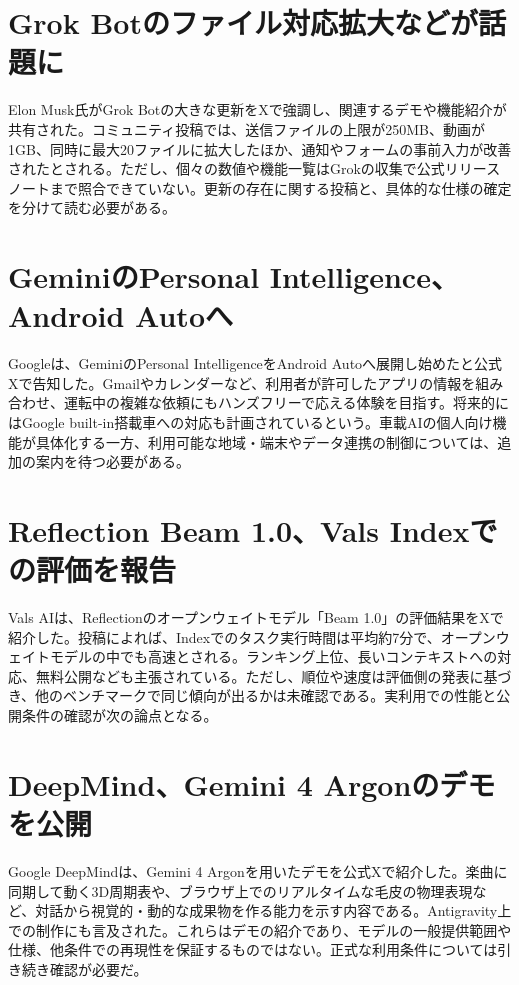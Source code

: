\section{Grok Botのファイル対応拡大などが話題に}
Elon Musk氏がGrok Botの大きな更新をXで強調し、関連するデモや機能紹介が共有された。コミュニティ投稿では、送信ファイルの上限が250MB、動画が1GB、同時に最大20ファイルに拡大したほか、通知やフォームの事前入力が改善されたとされる。ただし、個々の数値や機能一覧はGrokの収集で公式リリースノートまで照合できていない。更新の存在に関する投稿と、具体的な仕様の確定を分けて読む必要がある。

\section{GeminiのPersonal Intelligence、Android Autoへ}
Googleは、GeminiのPersonal IntelligenceをAndroid Autoへ展開し始めたと公式Xで告知した。Gmailやカレンダーなど、利用者が許可したアプリの情報を組み合わせ、運転中の複雑な依頼にもハンズフリーで応える体験を目指す。将来的にはGoogle built-in搭載車への対応も計画されているという。車載AIの個人向け機能が具体化する一方、利用可能な地域・端末やデータ連携の制御については、追加の案内を待つ必要がある。

\section{Reflection Beam 1.0、Vals Indexでの評価を報告}
Vals AIは、Reflectionのオープンウェイトモデル「Beam 1.0」の評価結果をXで紹介した。投稿によれば、Indexでのタスク実行時間は平均約7分で、オープンウェイトモデルの中でも高速とされる。ランキング上位、長いコンテキストへの対応、無料公開なども主張されている。ただし、順位や速度は評価側の発表に基づき、他のベンチマークで同じ傾向が出るかは未確認である。実利用での性能と公開条件の確認が次の論点となる。

\section{DeepMind、Gemini 4 Argonのデモを公開}
Google DeepMindは、Gemini 4 Argonを用いたデモを公式Xで紹介した。楽曲に同期して動く3D周期表や、ブラウザ上でのリアルタイムな毛皮の物理表現など、対話から視覚的・動的な成果物を作る能力を示す内容である。Antigravity上での制作にも言及された。これらはデモの紹介であり、モデルの一般提供範囲や仕様、他条件での再現性を保証するものではない。正式な利用条件については引き続き確認が必要だ。

